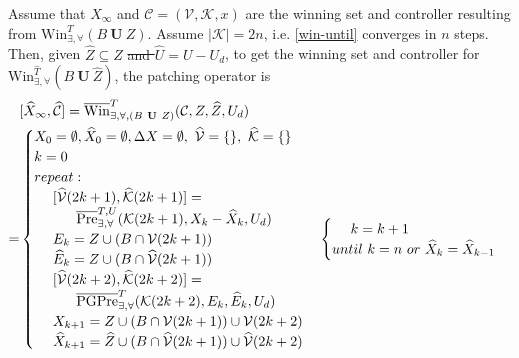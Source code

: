 Assume that $ X_\infty $ and $ \mathcal{C}=(\mathcal{V},\mathcal{K},x) $ are the winning set and controller resulting from $ \text{Win}_{\exists,\forall}^{T}(B\mathbf{\ U\ }Z) $. Assume $ \vert \mathcal{K}\vert = 2n $, i.e. \eqref{win-until} converges in $ n $ steps. Then, given $ \widehat{Z}\subseteq Z ${\color{teal} \sout{and $ \widehat{U}= U-U_d $}}, to get the winning set and controller for $ \text{Win}_{\exists,\forall}^{\widehat{T}}(B\mathbf{\ U\ }\widehat{Z}) $, the patching operator is
{\small\begin{align}
\begin{split}
&[\widehat{X}_\infty, \widehat{\mathcal{C}}]=\overline{\text{Win}}^{T}_{\exists,\forall, (B\mathbf{\ U\ }Z)}(\mathcal{C},Z,\widehat{Z}, U_d)\\
=&\begin{cases}
X_0 = \emptyset, \widehat{X}_0 = \emptyset, \Delta X = \emptyset, \ \widehat{\mathcal{V}}=\{\},\ \widehat{\mathcal{K}}=\{\}\\
{\color{black} k = 0}\\
{\color{black} repeat:}\\
\ \ \ \ [\widehat{\mathcal{V}}(2k+1),\widehat{\mathcal{K}}(2k+1)] =\\ \ \ \ \ \ \ \ \ \  \overline{\text{Pre}}_{\exists,\forall}^{T,U}(\mathcal{K}(2k+1),X_{k}-\widehat{X}_{k}, U_d)\\
\ \ \ \ E_k = Z\cup (B\cap \mathcal{V}(2k+1))\\
\ \ \ \  \widehat{E}_k =  Z\cup (B\cap \widehat{\mathcal{V}}(2k+1))\\
\ \ \ \ [\widehat{\mathcal{V}}(2k+2),\widehat{\mathcal{K}}(2k+2)] =\\ \ \ \ \ \ \ \ \ \  \overline{\text{PGPre}}_{\exists,\forall}^{T}(\mathcal{K}(2k+2),E_k, \widehat{E}_k,U_d)\\ 
\ \ \ \ X_{k+1} = Z\cup (B\cap \mathcal{V}(2k+1)) \cup \mathcal{V}(2k+2)\\
\ \ \ \ \widehat{X}_{k+1} =\widehat{Z}\cup (B\cap \widehat{\mathcal{V}}(2k+1)) \cup \widehat{\mathcal{V}}(2k+2)\\
\end{cases}
\begin{cases}
\ \ \ \ {\color{black} k = k +1}\\
{\color{black} until \ k = n \ or \ \widehat{X}_{k}=\widehat{X}_{k-1}}\\

\end{cases}
\end{split}
\end{align}}
